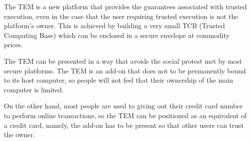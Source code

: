 The TEM is a new platform that provides the guarantees associated with trusted
execution, even in the case that the user requiring trusted execution is not the
platform's owner. This is achieved by building a very small TCB (Trusted
Computing Base) which can be enclosed in a secure envelope at commodity prices.

The TEM can be presented in a way that avoids the social protest met by most
secure platforms. The TEM is an add-on that does not to be permanently bound to
its host computer, so people will not feel that their ownership of the main
computer is limited.

On the other hand, most people are used to giving out their credit card number
to perform online transactions, so the TEM can be positioned as an
equivalent of a credit card, namely, the add-on has to be present so that other
users can trust the owner.
